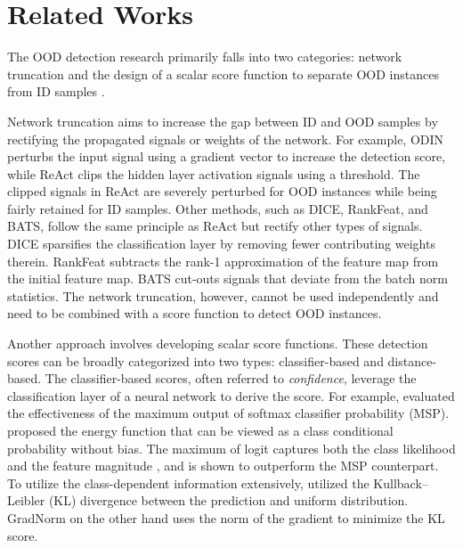 \documentclass[10pt,twocolumn,letterpaper]{article}
\begin{document}
\section{Related Works}
\label{sec:related}

The OOD detection research primarily falls into two categories: network truncation \cite{liang2017enhancing,sun2021react} and the design of a scalar score function to separate OOD instances from ID samples \cite{hendrycks2016baseline,liu2020energy}.

Network truncation \cite{liang2017enhancing,sun2021react} aims to increase the gap between ID and OOD samples by rectifying the propagated signals or weights of the network. For example, ODIN \cite{liang2017enhancing} perturbs the input signal using a gradient vector to increase the detection score, while ReAct \cite{sun2021react} clips the hidden layer activation signals using a threshold.
The clipped signals in ReAct are severely perturbed for OOD instances while being fairly retained for ID samples.
Other methods, such as DICE, RankFeat, and BATS, follow the same principle as ReAct but rectify other types of signals. 
DICE \cite{sun2022dice} sparsifies the classification layer by removing fewer contributing weights therein. RankFeat \cite{song2022rankfeat} subtracts the rank-1 approximation of the feature map from the initial feature map. BATS \cite{zhu2022boosting} cut-outs signals that deviate from the batch norm statistics.
The network truncation, however, cannot be used independently and need to be combined with a score function to detect OOD instances.



Another approach involves developing scalar score functions. 
These detection scores can be broadly categorized into two types: classifier-based and distance-based. The classifier-based scores, often referred to \textit{confidence}, leverage the classification layer of a neural network to derive the score. For example, \cite{hendrycks2016baseline} evaluated the effectiveness of the maximum output of softmax classifier probability (MSP). \cite{liu2020energy} proposed the energy function that can be viewed as a class conditional probability without bias. The maximum of logit \cite{vaze2021open,hendrycks2019scaling} captures both the class likelihood and the feature magnitude \cite{dhamija2018reducing}, and is shown to outperform the MSP counterpart. To utilize the class-dependent information extensively, \cite{hendrycks2019scaling} utilized the Kullback–Leibler (KL) divergence between the prediction and uniform distribution. GradNorm \cite{huang2021importance} on the other hand uses the norm of the gradient to minimize the KL score.
\end{document}
